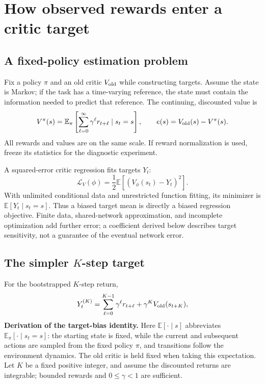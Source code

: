 \documentclass[11pt,a4paper]{article}
\numberwithin{equation}{section}
\newcommand{\E}{\mathbb E}
\begin{document}
\section{How observed rewards enter a critic target}
\subsection{A fixed-policy estimation problem}
Fix a policy $\pi$ and an old critic $V_{\rm old}$ while constructing targets.
Assume the state is Markov; if the task has a time-varying reference, the state
must contain the information needed to predict that reference. The continuing,
discounted value is
\begin{equation}
 V^\pi(s)=\E_\pi\left[\sum_{\ell=0}^{\infty}\gamma^\ell r_{t+\ell}
 \mid s_t=s\right],\qquad
 e(s)=V_{\rm old}(s)-V^\pi(s).
\end{equation}
All rewards and values are on the same scale. If reward normalization is used,
freeze its statistics for the diagnostic experiment.

A squared-error critic regression fits targets $Y_t$:
\begin{equation}
 \mathcal L_V(\phi)=\frac12\E[(V_\phi(s_t)-Y_t)^2].
\end{equation}
With unlimited conditional data and unrestricted function fitting, its minimizer
is $\E[Y_t\mid s_t=s]$. Thus a biased target mean is directly a biased regression
objective. Finite data, shared-network approximation, and incomplete optimization
add further error; a coefficient derived below describes target sensitivity,
not a guarantee of the eventual network error.

\subsection{The simpler \texorpdfstring{$K$}{K}-step target}
For the bootstrapped $K$-step return,
\begin{equation}
 Y_t^{(K)}=\sum_{\ell=0}^{K-1}\gamma^\ell r_{t+\ell}
       +\gamma^K V_{\rm old}(s_{t+K}),
\end{equation}
\textbf{Derivation of the target-bias identity.}
Here $\E[\cdot\mid s]$ abbreviates $\E_\pi[\cdot\mid s_t=s]$:
the starting state is fixed, while the current and subsequent actions are sampled
from the fixed policy $\pi$, and transitions follow the environment dynamics.
The old critic is held fixed when taking this expectation. Let $K$ be a fixed
positive integer, and assume the discounted returns are integrable; bounded
rewards and $0\le\gamma<1$ are sufficient.
\end{document}
